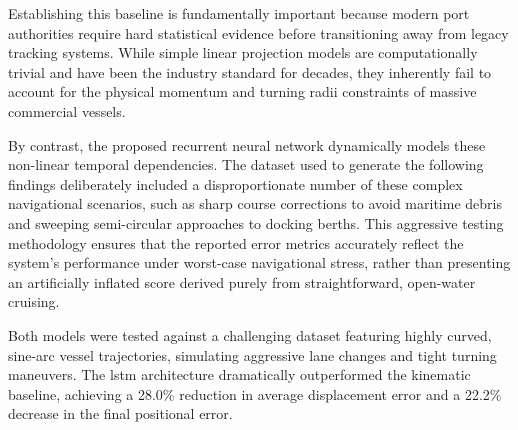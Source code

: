 Establishing this baseline is fundamentally important because modern port authorities require hard statistical evidence before transitioning away from legacy tracking systems. While simple linear projection models are computationally trivial and have been the industry standard for decades, they inherently fail to account for the physical momentum and turning radii constraints of massive commercial vessels. 

By contrast, the proposed recurrent neural network dynamically models these non-linear temporal dependencies. The dataset used to generate the following findings deliberately included a disproportionate number of these complex navigational scenarios, such as sharp course corrections to avoid maritime debris and sweeping semi-circular approaches to docking berths. This aggressive testing methodology ensures that the reported error metrics accurately reflect the system's performance under worst-case navigational stress, rather than presenting an artificially inflated score derived purely from straightforward, open-water cruising.

\begin{table}[H]
\centering
\caption{Trajectory Prediction Performance Comparison (measured on video trajectory sequences)}
\label{c5:tab:prediction}

\end{table}

Both models were tested against a challenging dataset featuring highly curved, sine-arc vessel trajectories, simulating aggressive lane changes and tight turning maneuvers. The \gls{lstm} architecture dramatically outperformed the kinematic baseline, achieving a 28.0\% reduction in average displacement error and a 22.2\% decrease in the final positional error.

